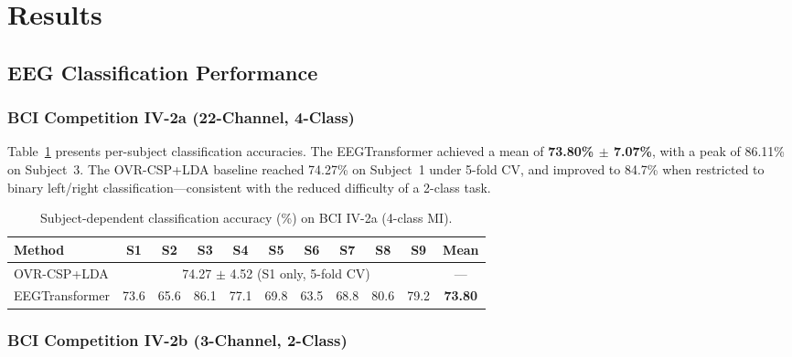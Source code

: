 \documentclass[12pt, a4paper]{article}
\begin{document}
\section{Results}

\subsection{EEG Classification Performance}

\subsubsection{BCI Competition IV-2a (22-Channel, 4-Class)}

Table~\ref{tab:iv2a_results} presents per-subject classification accuracies. The EEGTransformer achieved a mean of \textbf{73.80\% $\pm$ 7.07\%}, with a peak of 86.11\% on Subject~3. The OVR-CSP+LDA baseline reached 74.27\% on Subject~1 under 5-fold CV, and improved to 84.7\% when restricted to binary left/right classification---consistent with the reduced difficulty of a 2-class task.

\begin{table}[htbp]
\centering
\caption{Subject-dependent classification accuracy (\%) on BCI IV-2a (4-class MI).}
\label{tab:iv2a_results}
\begin{tabular}{lcccccccccc}
\toprule
\textbf{Method} & \textbf{S1} & \textbf{S2} & \textbf{S3} & \textbf{S4} & \textbf{S5} & \textbf{S6} & \textbf{S7} & \textbf{S8} & \textbf{S9} & \textbf{Mean} \\
\midrule
OVR-CSP+LDA & \multicolumn{9}{c}{74.27 $\pm$ 4.52 (S1 only, 5-fold CV)} & --- \\
EEGTransformer & 73.6 & 65.6 & 86.1 & 77.1 & 69.8 & 63.5 & 68.8 & 80.6 & 79.2 & \textbf{73.80} \\
\bottomrule
\end{tabular}
\end{table}

\subsubsection{BCI Competition IV-2b (3-Channel, 2-Class)}
\end{document}
